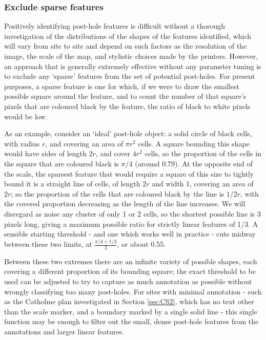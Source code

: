\documentclass[../../ArchStats.tex]{subfiles}
\begin{document}
\subsubsection{Exclude sparse features}

Positively identifying post-hole features is difficult without a thorough investigation of the distributions of the shapes of the features identified, which will vary from site to site and depend on such factors as the resolution of the image, the scale of the map, and stylistic choices made by the printers. However, an approach that is generally extremely effective without any parameter tuning is to exclude any `sparse' features from the set of potential post-holes. For present purposes, a sparse feature is one for which, if we were to draw the smallest possible square around the feature, and to count the number of that square's pixels that are coloured black by the feature, the ratio of black to white pixels would be low.


As an example, consider an `ideal' post-hole object: a solid circle of black cells, with radius $r$, and covering an area of $\pi r^2$ cells. A square bounding this shape would have sides of length $2r$, and cover $4r^2$ cells, so the proportion of the cells in the square that are coloured black is $\pi/4$ (around 0.79). At the opposite end of the scale, the sparsest feature that would require a square of this size to tightly bound it is a straight line of cells, of length $2r$ and width 1, covering an area of $2r$; so the proportion of the cells that are coloured black by the line is $1/2r$, with the covered proportion decreasing as the length of the line increases. We will disregard as noise any cluster of only 1 or 2 cells, so the shortest possible line is 3 pixels long, giving a maximum possible ratio for strictly linear features of 1/3. A sensible starting threshold - and one which works well in practice - cuts midway between these two limits, at $\frac{\pi/4+1/3}{2}$, or about 0.55. 

Between these two extremes there are an infinite variety of possible shapes, each covering a different proportion of its bounding square; the exact threshold to be used can be adjusted to try to capture as much annotation as possible without wrongly classifying too many post-holes. For sites with minimal annotation - such as the Catholme plan investigated in Section \ref{sec:CS2}, which has no text other than the scale marker, and a boundary marked by a single solid line - this single function may be enough to filter out the small, dense post-hole features from the annotations and larger linear features.
\end{document}
